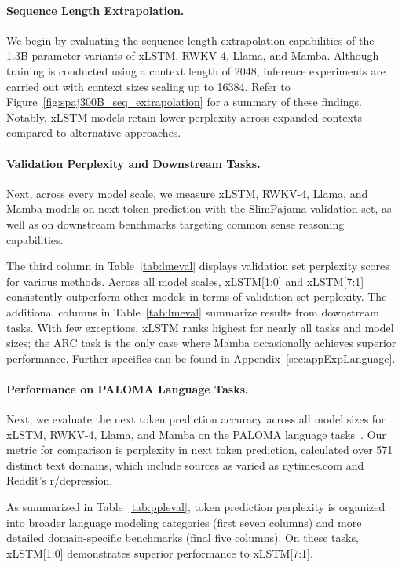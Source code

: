 \paragraph{Sequence Length Extrapolation.}
\label{sec:spaj300B_ctx_extrapolation}
We begin by evaluating the sequence length extrapolation capabilities of the 1.3B-parameter variants of xLSTM, RWKV-4, Llama, and Mamba. Although training is conducted using a context length of 2048, inference experiments are carried out with context sizes scaling up to 16384. Refer to Figure~\ref{fig:spaj300B_seq_extrapolation} for a summary of these findings. Notably, xLSTM models retain lower perplexity across expanded contexts compared to alternative approaches.

\paragraph{Validation Perplexity and Downstream Tasks.}
\label{sec:spaj_downstream_eval}
Next, across every model scale, we measure xLSTM, RWKV-4, Llama, and Mamba models on next token prediction with the SlimPajama validation set, as well as on downstream benchmarks targeting common sense reasoning capabilities.

The third column in Table~\ref{tab:lmeval} displays validation set perplexity scores for various methods. Across all model scales, xLSTM[1:0] and xLSTM[7:1] consistently outperform other models in terms of validation set perplexity. The additional columns in Table~\ref{tab:lmeval} summarize results from downstream tasks. With few exceptions, xLSTM ranks highest for nearly all tasks and model sizes; the ARC task is the only case where Mamba occasionally achieves superior performance. Further specifics can be found in Appendix~\ref{sec:appExpLanguage}.

\paragraph{Performance on PALOMA Language Tasks.} Next, we evaluate the next token prediction accuracy across all model sizes for xLSTM, RWKV-4, Llama, and Mamba on the PALOMA language tasks~\citep{Magnusson:23arxivshort}. Our metric for comparison is perplexity in next token prediction, calculated over 571 distinct text domains, which include sources as varied as nytimes.com and Reddit’s r/depression.

As summarized in Table~\ref{tab:ppleval}, token prediction perplexity is organized into broader language modeling categories (first seven columns) and more detailed domain-specific benchmarks (final five columns). On these tasks, xLSTM[1:0] demonstrates superior performance to xLSTM[7:1].

